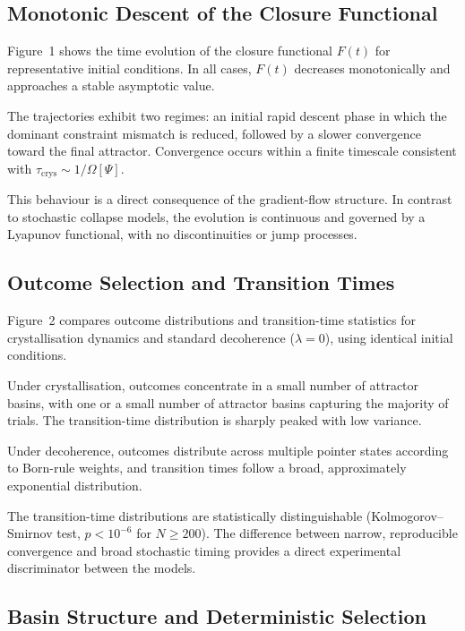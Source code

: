 \documentclass[12pt]{article}
\begin{document}
\subsection{Monotonic Descent of the Closure Functional}

Figure~1 shows the time evolution of the closure functional $F(t)$ for representative initial conditions. In all cases, $F(t)$ decreases monotonically and approaches a stable asymptotic value.

The trajectories exhibit two regimes: an initial rapid descent phase in which the dominant constraint mismatch is reduced, followed by a slower convergence toward the final attractor. Convergence occurs within a finite timescale consistent with $\tau_{\mathrm{crys}} \sim 1/\Omega[\Psi]$.

This behaviour is a direct consequence of the gradient-flow structure. In contrast to stochastic collapse models, the evolution is continuous and governed by a Lyapunov functional, with no discontinuities or jump processes.

\subsection{Outcome Selection and Transition Times}

Figure~2 compares outcome distributions and transition-time statistics for crystallisation dynamics and standard decoherence ($\lambda = 0$), using identical initial conditions.

Under crystallisation, outcomes concentrate in a small number of attractor basins, with one or a small number of attractor basins capturing the majority of trials. The transition-time distribution is sharply peaked with low variance.

Under decoherence, outcomes distribute across multiple pointer states according to Born-rule weights, and transition times follow a broad, approximately exponential distribution.

The transition-time distributions are statistically distinguishable (Kolmogorov--Smirnov test, $p < 10^{-6}$ for $N \geq 200$). The difference between narrow, reproducible convergence and broad stochastic timing provides a direct experimental discriminator between the models.

\subsection{Basin Structure and Deterministic Selection}
\end{document}
